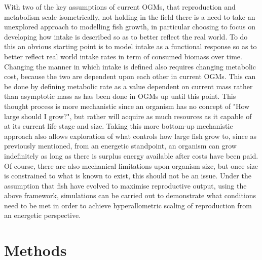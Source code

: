 \documentclass[a4paper, 11pt, hidelinks]{article} %
\begin{document}
	With two of the key assumptions of current OGMs, that reproduction and metabolism scale isometrically, not holding in the field \parencite{Barneche2018, Pawar2012, Peters1983} there is a need to take an unexplored approach to modelling fish growth, in particular choosing to focus on developing how intake is described so as to better reflect the real world.  To do this an obvious starting point is to model intake as a functional response \parencite{Holling1959} so as to better reflect real world intake rates in term of consumed biomass over time.  Changing the manner in which intake is defined also requires changing metabolic cost, because the two are dependent upon each other in current OGMs.  This can be done by defining metabolic rate as a value dependent on current mass rather than asymptotic mass as has been done in OGMs up until this point.  This thought process is more mechanistic since an organism has no concept of "How large should I grow?", but rather will acquire as much resources as it capable of at its current life stage and size.  Taking this more bottom-up mechanistic approach also allows exploration of what controls how large fish grow to, since as previously mentioned, from an energetic standpoint, an organism can grow indefinitely as long as there is surplus energy available after costs have been paid.  Of course, there are also mechanical limitations upon organism size, but once  size is constrained to what is known to exist, this should not be an issue.  
	Under the assumption that fish have evolved to maximise reproductive output, using the above framework, simulations can be carried out to demonstrate what conditions need to be met in order to achieve hyperallometric scaling of reproduction from an energetic perspective.
	

% 
	\nolinenumbers
	
\section{Methods}
	\linenumbers
	
\end{document}
